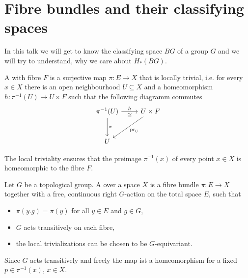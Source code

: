 \section{Fibre bundles and their classifying spaces}
In this talk we will get to know the classifying space $BG$ of a group $G$ and we will try to understand, why we care about $H_*(BG)$.

\begin{definition}[{name=[fibre bundle]}]
	A  with fibre $F$ is a surjective map $\pi \colon E \to X$ that is locally trivial, i.e. for every $x \in X$ there is an open neighbourhood $U \subseteq X$ and a homeomorphism $h \colon \pi^{-1}(U) \to U \times F$ such that the following diagramm commutes
	\[
		\begin{tikzcd}[row sep=large]
			\pi^{-1}(U) \rar["h","\cong"'] \dar["\pi"] & U \times F \dlar["\pr_U"] \\
			U
		\end{tikzcd}
	\]
\end{definition}

The local triviality ensures that the preimage $\pi^{-1}(x)$ of every point $x \in X$ is homeomorphic to the fibre $F$.

\begin{definition}[{name=[G-principal bundle]}]
	Let $G$ be a topological group.
	A  over a space $X$ is a fibre bundle $\pi \colon E \to X$ together with a free, continuous right $G$-action on the total space $E$, such that 
	\begin{itemize}
		\item $\pi(y.g) = \pi(y)$ for all $y \in E$ and $g \in G$,
		\item $G$ acts transitively on each fibre,
		\item the local trivializations can be chosen to be $G$-equivariant.
	\end{itemize}
	
\end{definition}

\begin{remark}
	Since $G$ acts transitively and freely the map 
	ist a homeomorphism for a fixed $p \in \pi^{-1}(x)$, $x \in X$.
\end{remark}

